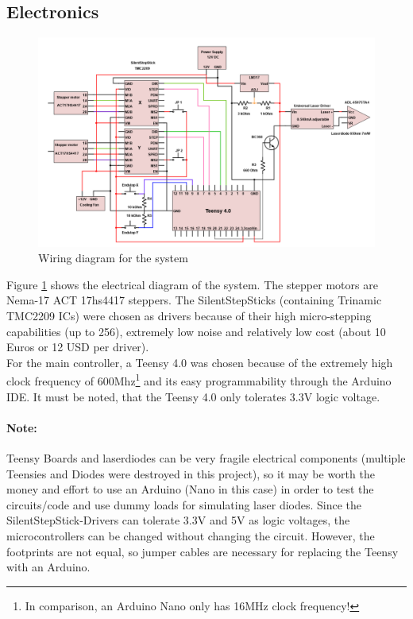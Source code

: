 \documentclass[a4paper, 11pt]{scrartcl}
\begin{document}
\subsection{Electronics}
\begin{figure}[H]
\begin{center}
\includegraphics[width=15cm]{img/electronics.png}
\caption{Wiring diagram for the system}
\label{electronics}
\end{center}
\end{figure}
Figure \ref{electronics} shows the electrical diagram of the system. The stepper motors are Nema-17 ACT 17hs4417 steppers. The SilentStepSticks (containing Trinamic TMC2209 ICs)  were chosen as drivers because of their high micro-stepping capabilities (up to 256), extremely low noise and relatively low cost (about 10 Euros or 12 USD per driver). \\
For the main controller, a Teensy 4.0 was chosen because of the extremely high clock frequency of 600Mhz\footnote{In comparison, an Arduino Nano only has 16MHz clock frequency!} and its easy programmability through the Arduino IDE. It must be noted, that the Teensy 4.0 only tolerates 3.3V logic voltage. 

\paragraph{Note:} Teensy Boards and laserdiodes can be very fragile electrical components (multiple Teensies and Diodes were destroyed in this project), so it may be worth the money and effort to use an Arduino (Nano in this case) in order to test the circuits/code and use dummy loads for simulating laser diodes. Since the SilentStepStick-Drivers can tolerate 3.3V and 5V as logic voltages, the microcontrollers can be changed without changing the circuit. However, the footprints are not equal, so jumper cables are necessary for replacing the Teensy with an Arduino. \\
\end{document}
